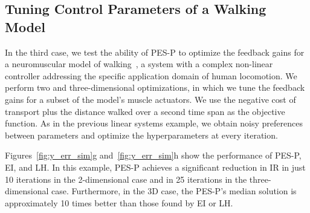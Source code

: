 \subsection{Tuning Control Parameters of a Walking Model
    }\label{sec:sim_neuro}
In the third case, we test the ability of PES-P to optimize the feedback gains
for a neuromuscular model of walking~\citep{thatte2016toward}, a system with a
complex non-linear controller addressing the specific application domain of
human locomotion. We perform two and three-dimensional optimizations, in which
we tune the feedback gains for a subset of the model's muscle actuators.  We use
the negative cost of transport plus the distance walked over a \unit[20]{second}
time span as the objective function. As in the previous linear systems example,
we obtain noisy preferences between parameters and optimize the hyperparameters
at every iteration.

Figures~\ref{fig:y_err_sim}g and~\ref{fig:y_err_sim}h show the performance of
PES-P, EI, and LH\@. In this example, PES-P achieves a significant reduction in
IR in just 10 iterations in the 2-dimensional case and in 25 iterations in the
three-dimensional case.  Furthermore, in the 3D case, the PES-P's median
solution is approximately 10 times better than those found by EI or LH\@. 
